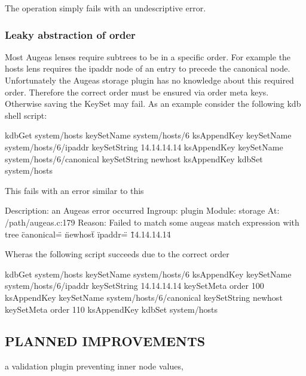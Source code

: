 The operation simply fails with an undescriptive error.

\subsubsection*{Leaky abstraction of order}

Most Augeas lenses require subtrees to be in a specific order. For example the hosts lens requires the ipaddr node of an entry to precede the canonical node. Unfortunately the Augeas storage plugin has no knowledge about this required order. Therefore the correct order must be ensured via order meta keys. Otherwise saving the Key\+Set may fail. As an example consider the following kdb shell script\+: \begin{DoxyVerb}    kdbGet system/hosts
    keySetName system/hosts/6
    ksAppendKey
    keySetName system/hosts/6/ipaddr
    keySetString 14.14.14.14
    ksAppendKey
    keySetName system/hosts/6/canonical
    keySetString newhost
    ksAppendKey
    kdbSet system/hosts
\end{DoxyVerb}


This fails with an error similar to this \begin{DoxyVerb}    Description: an Augeas error occurred
    Ingroup: plugin
    Module: storage
    At: /path/augeas.c:179
    Reason: Failed to match
    some augeas match expression
    with tree
    { \"canonical\" = \"newhost\" } { \"ipaddr\" = \"14.14.14.14\" }
\end{DoxyVerb}


Wheras the following script succeeds due to the correct order \begin{DoxyVerb}    kdbGet system/hosts
    keySetName system/hosts/6
    ksAppendKey
    keySetName system/hosts/6/ipaddr
    keySetString 14.14.14.14
    keySetMeta order 100
    ksAppendKey
    keySetName system/hosts/6/canonical
    keySetString newhost
    keySetMeta order 110
    ksAppendKey
    kdbSet system/hosts
\end{DoxyVerb}


\subsection*{P\+L\+A\+N\+N\+E\+D I\+M\+P\+R\+O\+V\+E\+M\+E\+N\+T\+S}


\begin{DoxyItemize}
\item a validation plugin preventing inner node values, 
\end{DoxyItemize}
